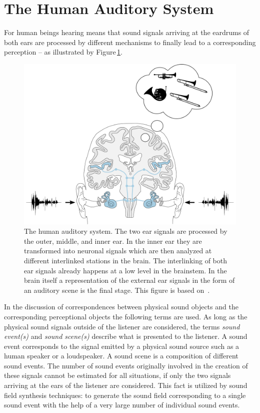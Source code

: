 \section{The Human Auditory System}
\label{sec:hearing_of_the_human_auditory_system}
%
For human beings hearing means that sound signals arriving
at the eardrums of both ears are processed by different mechanisms to finally
lead to a corresponding perception -- as illustrated by
Figure\,\ref{fig:auditory_scene}.
%
\begin{figure}
    \centering
    \includegraphics[width=.8\columnwidth]{fig1_01/fig1_01}
    \caption{The human auditory system. The two ear signals are processed by the
    outer, middle, and inner ear. In the inner ear they are transformed into
    neuronal signals which are then analyzed at different interlinked stations
    in the brain. The interlinking of both ear signals already happens
    at a low level in the brainstem. In the brain itself a representation of
    the external ear signals in the form of an auditory scene is the final stage.
    This figure is based on~\cite{Grothe2010,Talbot2011a,Chittka2005}.
    }
    \label{fig:auditory_scene}
\end{figure}

In the discussion of correspondences
between physical sound objects and the corresponding perceptional
objects the following terms are used. As long as the physical
sound signals outside of the listener are considered, the terms
\emph{sound event(s)} and \emph{sound scene(s)} describe what is presented to
the listener. A sound event corresponds to the signal emitted by
a physical sound source such as a
human speaker or a loudspeaker. A sound scene is a composition of different
sound events.
The number of sound events originally involved in the creation of these
signals cannot be estimated for all situations, if only the two signals arriving
at the ears of the listener are considered.
This fact
is utilized by sound field synthesis techniques: to generate the sound field
corresponding to a single sound event with the help of a very large number of
individual sound
events.

